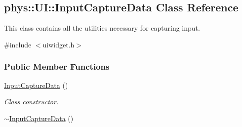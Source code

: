 \hypertarget{classphys_1_1UI_1_1InputCaptureData}{
\subsection{phys::UI::InputCaptureData Class Reference}
\label{classphys_1_1UI_1_1InputCaptureData}
}


This class contains all the utilities necessary for capturing input.  




{\ttfamily \#include $<$uiwidget.h$>$}

\subsubsection*{Public Member Functions}
\begin{DoxyCompactItemize}
\item 
\hypertarget{classphys_1_1UI_1_1InputCaptureData_a3880b8daa9662bc5c117343040661563}{
\hyperlink{classphys_1_1UI_1_1InputCaptureData_a3880b8daa9662bc5c117343040661563}{InputCaptureData} ()}
\label{classphys_1_1UI_1_1InputCaptureData_a3880b8daa9662bc5c117343040661563}

\begin{DoxyCompactList}\small\item\em Class constructor. \item\end{DoxyCompactList}\item 
\hypertarget{classphys_1_1UI_1_1InputCaptureData_a7bd115ce3c6ab7e3a886c26ea99407a5}{
\hyperlink{classphys_1_1UI_1_1InputCaptureData_a7bd115ce3c6ab7e3a886c26ea99407a5}{$\sim$InputCaptureData} ()}
\label{classphys_1_1UI_1_1InputCaptureData_a7bd115ce3c6ab7e3a886c26ea99407a5}


\end{DoxyCompactItemize}
